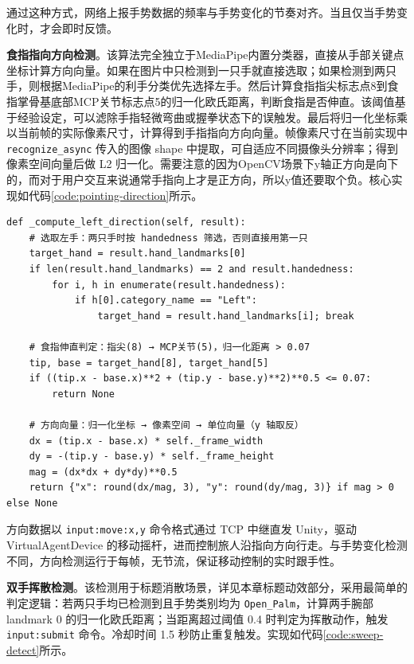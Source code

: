 \documentclass[bachelor]{njupthesis}
\begin{document}
通过这种方式，网络上报手势数据的频率与手势变化的节奏对齐。当且仅当手势变化时，才会即时反馈。

\textbf{食指指向方向检测}。该算法完全独立于MediaPipe内置分类器，直接从手部关键点坐标计算方向向量。如果在图片中只检测到一只手就直接选取；如果检测到两只手，则根据MediaPipe的利手分类优先选择左手。然后计算食指指尖标志点8到食指掌骨基底部MCP关节标志点5的归一化欧氏距离，判断食指是否伸直。该阈值基于经验设定，可以滤除手指轻微弯曲或握拳状态下的误触发。最后将归一化坐标乘以当前帧的实际像素尺寸，计算得到手指指向方向向量。帧像素尺寸在当前实现中 \texttt{recognize\_async} 传入的图像 shape 中提取，可自适应不同摄像头分辨率；得到像素空间向量后做 L2 归一化。需要注意的因为OpenCV场景下y轴正方向是向下的，而对于用户交互来说通常手指向上才是正方向，所以y值还要取个负。核心实现如代码\ref{code:pointing-direction}所示。

\begin{code}
\caption{食指指向方向计算}
\label{code:pointing-direction}
\lstset{style=codeblock}
\begin{lstlisting}
def _compute_left_direction(self, result):
    # 选取左手：两只手时按 handedness 筛选，否则直接用第一只
    target_hand = result.hand_landmarks[0]
    if len(result.hand_landmarks) == 2 and result.handedness:
        for i, h in enumerate(result.handedness):
            if h[0].category_name == "Left":
                target_hand = result.hand_landmarks[i]; break

    # 食指伸直判定：指尖(8) → MCP关节(5)，归一化距离 > 0.07
    tip, base = target_hand[8], target_hand[5]
    if ((tip.x - base.x)**2 + (tip.y - base.y)**2)**0.5 <= 0.07:
        return None

    # 方向向量：归一化坐标 → 像素空间 → 单位向量（y 轴取反）
    dx = (tip.x - base.x) * self._frame_width
    dy = -(tip.y - base.y) * self._frame_height
    mag = (dx*dx + dy*dy)**0.5
    return {"x": round(dx/mag, 3), "y": round(dy/mag, 3)} if mag > 0 else None
\end{lstlisting}
\end{code}

方向数据以 \texttt{input:move:x,y} 命令格式通过 TCP 中继直发 Unity，驱动 VirtualAgentDevice 的移动摇杆，进而控制旅人沿指向方向行走。与手势变化检测不同，方向检测运行于每帧，无节流，保证移动控制的实时跟手性。

\textbf{双手挥散检测}。该检测用于标题消散场景，详见本章标题动效部分，采用最简单的判定逻辑：若两只手均已检测到且手势类别均为 \texttt{Open\_Palm}，计算两手腕部 landmark 0 的归一化欧氏距离；当距离超过阈值 0.4 时判定为挥散动作，触发 \texttt{input:submit} 命令。冷却时间 1.5 秒防止重复触发。实现如代码\ref{code:sweep-detect}所示。
\end{document}
